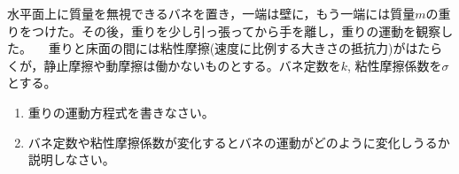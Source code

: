 \documentclass[twocolumn,11pt]{jarticle}
\begin{document}
\nquestion
水平面上に質量を無視できるバネを置き，一端は壁に，もう一端には質量$m$の重りをつけた。その後，重りを少し引っ張ってから手を離し，重りの運動を観察した。
　重りと床面の間には粘性摩擦(速度に比例する大きさの抵抗力)がはたらくが，静止摩擦や動摩擦は働かないものとする。バネ定数を$k$, 粘性摩擦係数を$\sigma$とする。
\begin{enumerate}
	\item 重りの運動方程式を書きなさい。
	\item バネ定数や粘性摩擦係数が変化するとバネの運動がどのように変化しうるか説明しなさい。
\end{enumerate}

\newpage
\appendix
{}
\end{document}
